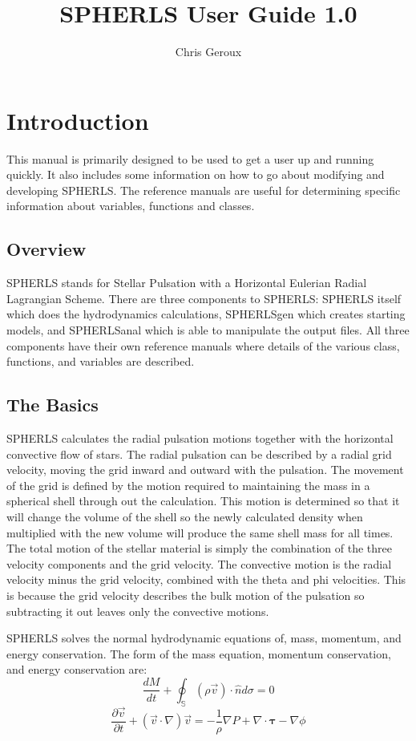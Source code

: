 \documentclass[12pt,a4paper]{book}
\title{SPHERLS User Guide 1.0}
\author{Chris Geroux}
\begin{document}
\maketitle

\section{Introduction}
This manual is primarily designed to be used to get a user up and running quickly. It also includes some information on how to go about modifying and developing SPHERLS. The reference manuals are useful for determining specific information about variables, functions and classes.

\subsection{Overview}
SPHERLS stands for Stellar Pulsation with a Horizontal Eulerian Radial Lagrangian Scheme. There are three components to SPHERLS: SPHERLS itself which does the hydrodynamics calculations, SPHERLSgen which creates starting models, and SPHERLSanal which is able to manipulate the output files. All three components have their own reference manuals where details of the various class, functions, and variables are described.
  
\subsection{The Basics}
SPHERLS calculates the radial pulsation motions together with the horizontal convective flow of stars. The radial pulsation can be described by a radial grid velocity, moving the grid inward and outward with the pulsation. The movement of the grid is defined by the motion required to maintaining the mass in a spherical shell through out the calculation. This motion is determined so that it will change the volume of the shell so the newly calculated density when multiplied with the new volume will produce the same shell mass for all times. The total motion of the stellar material is simply the combination of the three velocity components and the grid velocity.  The convective motion is the radial velocity minus the grid velocity, combined with the theta and phi velocities. This is because the grid velocity describes the bulk motion of the pulsation so subtracting it out leaves only the convective motions.

SPHERLS solves the normal hydrodynamic equations of, mass, momentum, and energy conservation. The form of the mass equation, momentum conservation, and energy conservation are:
\begin{equation}
\frac{d M}{d t} + \oint_{\mathbb{S}} \left(\rho\vec v\right)\cdot\hat{n}d\sigma=0
\end{equation}
\begin{equation}
\frac{\partial \vec{v}}{\partial t}+(\vec{v}\cdot\nabla)\vec{v}=-\frac{1}{\rho}\nabla P + \nabla\cdot\mathbf{\tau}-\nabla \phi
\end{equation}
  
\end{document}
